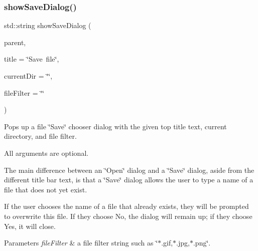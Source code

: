 \subsubsection{\texorpdfstring{show\+Save\+Dialog()}{showSaveDialog()}\hspace{0.1cm}{\footnotesize\ttfamily [3/3]}}
{\footnotesize\ttfamily std\+::string show\+Save\+Dialog (\begin{DoxyParamCaption}\item[{Q\+Widget $\ast$}]{parent,  }\item[{const std\+::string \&}]{title = {\ttfamily \char`\"{}Save~file\char`\"{}},  }\item[{const std\+::string \&}]{current\+Dir = {\ttfamily \char`\"{}\char`\"{}},  }\item[{const std\+::string \&}]{file\+Filter = {\ttfamily \char`\"{}\char`\"{}} }\end{DoxyParamCaption})\hspace{0.3cm}{\ttfamily [static]}}



Pops up a file \char`\"{}\+Save\char`\"{} chooser dialog with the given top title text, current directory, and file filter. 

All arguments are optional.

The main difference between an \char`\"{}\+Open\char`\"{} dialog and a \char`\"{}\+Save\char`\"{} dialog, aside from the different title bar text, is that a \char`\"{}\+Save\char`\"{} dialog allows the user to type a name of a file that does not yet exist.

If the user chooses the name of a file that already exists, they will be prompted to overwrite this file. If they choose No, the dialog will remain up; if they choose Yes, it will close. 
\begin{DoxyParams}{Parameters}
{\em file\+Filter} & a file filter string such as \char`\"{}$\ast$.\+gif,$\ast$.\+jpg,$\ast$.\+png\char`\"{}. \\
\hline
\end{DoxyParams}
